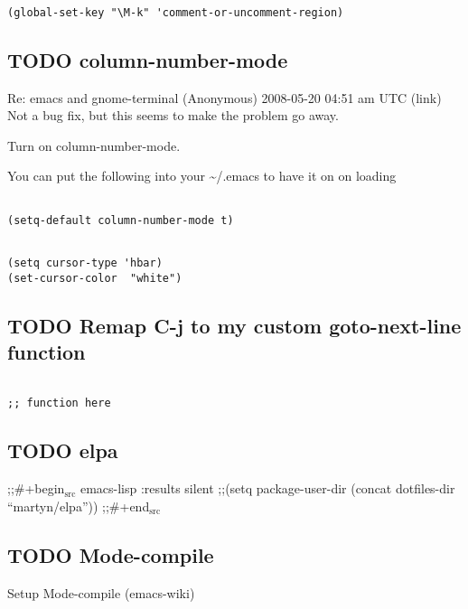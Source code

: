 \documentclass[colorlinks=true,urlcolor=blue,listings-sv]{article}
\begin{document}
{{{\lstset{language=Lisp}
\begin{lstlisting}

(global-set-key "\M-k" 'comment-or-uncomment-region)
\end{lstlisting}
\subsection{\textbf{TODO} column-number-mode}
\label{sec-2-43}


Re: emacs and gnome-terminal
(Anonymous)
2008-05-20 04:51 am UTC (link)
Not a bug fix, but this seems to make the problem go away.

Turn on column-number-mode.

You can put the following into your \~{}/.emacs to have it on on loading
 

\lstset{language=Lisp}
\begin{lstlisting}

(setq-default column-number-mode t)
\end{lstlisting}


\lstset{language=Lisp}
\begin{lstlisting}

(setq cursor-type 'hbar)
(set-cursor-color  "white")
\end{lstlisting}
\subsection{\textbf{TODO} Remap C-j to my custom goto-next-line function}
\label{sec-2-44}
\label{3f3b1218-c9dd-4dba-a2ee-f8aafa338992}



\lstset{language=Lisp}
\begin{lstlisting}

;; function here
\end{lstlisting}
\subsection{\textbf{TODO} elpa}
\label{sec-2-45}


;;\#+begin$_{\mathrm{src}}$ emacs-lisp :results silent
;;(setq package-user-dir (concat dotfiles-dir ``martyn/elpa''))
;;\#+end$_{\mathrm{src}}$
\subsection{\textbf{TODO} Mode-compile}
\label{sec-2-46}


Setup Mode-compile (emacs-wiki)


}}}
\end{document}
